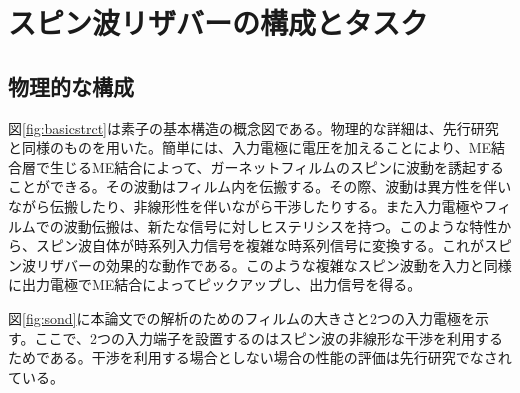 \documentclass[a4j, twocolumn]{jsarticle}
\begin{document}
\section{スピン波リザバーの構成とタスク}%
\label{sec:constandtask}

\subsection{物理的な構成}
\label{subsec:const}

図\ref{fig:basicstrct}は素子の基本構造の概念図である。物理的な詳細は、先行研究と同様のものを用いた\cite{Nakane2018IEEEAccess:_Reser_Compu_with_spin_waves_Excit_in_a_Garne_film,Nakane2018ICM:_demon_of_spin_wave_based_reser_compu_for_next_gener_machi_learn_devic}。簡単には、入力電極に電圧を加えることにより、ME結合層で生じるME結合によって、ガーネットフィルムのスピンに波動を誘起することができる。その波動はフィルム内を伝搬する。その際、波動は異方性を伴いながら伝搬したり、非線形性を伴いながら干渉したりする。また入力電極やフィルムでの波動伝搬は、新たな信号に対しヒステリシスを持つ。このような特性から、スピン波自体が時系列入力信号を複雑な時系列信号に変換する。これがスピン波リザバーの効果的な動作である。このような複雑なスピン波動を入力と同様に出力電極でME結合によってピックアップし、出力信号を得る。

図\ref{fig:sond}に本論文での解析のためのフィルムの大きさと2つの入力電極を示す。ここで、2つの入力端子を設置するのはスピン波の非線形な干渉を利用するためである。干渉を利用する場合としない場合の性能の評価は先行研究でなされている\cite{Nakane2018IEEEAccess:_Reser_Compu_with_spin_waves_Excit_in_a_Garne_film,Nakane2018ICM:_demon_of_spin_wave_based_reser_compu_for_next_gener_machi_learn_devic}。
\end{document}
